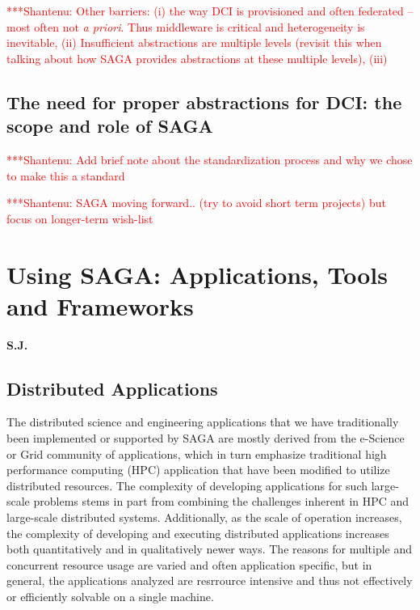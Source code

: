 \documentclass[a4paper,10pt]{article}
\newcommand{\jhanote}[1]{  {\textcolor{red}     { ***Shantenu: #1 }}}
\newcommand{\jhanote}[1]{}
\begin{document}
\jhanote{Other barriers: (i) the way DCI is provisioned and often
  federated -- most often not {\it a priori}. Thus middleware is
  critical and heterogeneity is inevitable, (ii) Insufficient
  abstractions are multiple levels (revisit this when talking about
  how SAGA provides abstractions at these multiple levels), (iii) }

\subsection{The need for proper abstractions for DCI: the scope and
  role of SAGA}

\jhanote{Add brief note about the standardization process and why we
  chose to make this a standard}

\jhanote{SAGA moving forward.. (try to avoid short term projects) but
  focus on longer-term wish-list}
 







\section{Using SAGA: Applications, Tools and Frameworks} \textbf{S.J.}

\subsection{Distributed Applications}

 The distributed science and engineering applications that we have
 traditionally been implemented or supported by SAGA are mostly
 derived from the e-Science or Grid community of applications, which
 in turn emphasize traditional high performance computing (HPC)
 application that have been modified to utilize distributed resources.
 The complexity of developing applications for such large-scale
 problems stems in part from combining the challenges inherent in HPC
 and large-scale distributed systems.  Additionally, as the scale of
 operation increases, the complexity of developing and executing
 distributed applications increases both quantitatively and in
 qualitatively newer ways.  The reasons for multiple and concurrent
 resource usage are varied and often application specific, but in
 general, the applications analyzed are resrrource intensive and thus
 not effectively or efficiently solvable on a single machine.
\end{document}
